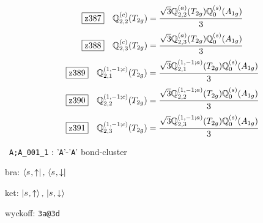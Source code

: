 \documentclass[fleqn,10pt,landscape]{jsarticle}
\begin{document}
\begin{dmath*}
\hspace*{3mm}\fbox{z387}\quad \mathbb{Q}_{2,2}^{(c)}(T_{2g})=\frac{\sqrt{3} \mathbb{Q}_{2,2}^{(a)}(T_{2g}) \mathbb{Q}_{0}^{(s)}(A_{1g})}{3}
\end{dmath*}
\begin{dmath*}
\hspace*{3mm}\fbox{z388}\quad \mathbb{Q}_{2,3}^{(c)}(T_{2g})=\frac{\sqrt{3} \mathbb{Q}_{2,3}^{(a)}(T_{2g}) \mathbb{Q}_{0}^{(s)}(A_{1g})}{3}
\end{dmath*}
\begin{dmath*}
\hspace*{3mm}\fbox{z389}\quad \mathbb{Q}_{2,1}^{(1,-1;c)}(T_{2g})=\frac{\sqrt{3} \mathbb{Q}_{2,1}^{(1,-1;a)}(T_{2g}) \mathbb{Q}_{0}^{(s)}(A_{1g})}{3}
\end{dmath*}
\begin{dmath*}
\hspace*{3mm}\fbox{z390}\quad \mathbb{Q}_{2,2}^{(1,-1;c)}(T_{2g})=\frac{\sqrt{3} \mathbb{Q}_{2,2}^{(1,-1;a)}(T_{2g}) \mathbb{Q}_{0}^{(s)}(A_{1g})}{3}
\end{dmath*}
\begin{dmath*}
\hspace*{3mm}\fbox{z391}\quad \mathbb{Q}_{2,3}^{(1,-1;c)}(T_{2g})=\frac{\sqrt{3} \mathbb{Q}_{2,3}^{(1,-1;a)}(T_{2g}) \mathbb{Q}_{0}^{(s)}(A_{1g})}{3}
\end{dmath*}
\vspace{5mm}

\noindent\textbullet\, \texttt{A;A_001_1} : '\texttt{A}'-'\texttt{A}' bond-cluster

\noindent\quad * bra: $\bra{s_{},\uparrow},\, \bra{s_{},\downarrow}$

\noindent\quad * ket: $\ket{s_{},\uparrow},\, \ket{s_{},\downarrow}$

\noindent\quad * wyckoff: \texttt{3a@3d}
\end{document}
